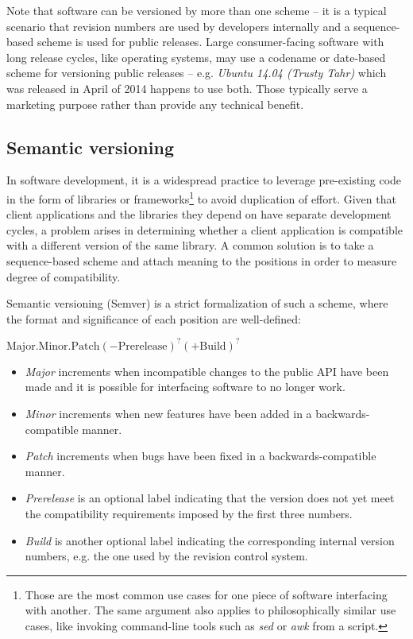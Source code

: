 \documentclass{l4proj}
\begin{document}
Note that software can be versioned by more than one scheme -- it is a
typical scenario that revision numbers are used by developers
internally and a sequence-based scheme is used for public releases.
Large consumer-facing software with long release cycles, like
operating systems, may use a codename or date-based scheme for
versioning public releases -- e.g. \textit{Ubuntu 14.04 (Trusty Tahr)}
which was released in April of 2014 happens to use both. Those
typically serve a marketing purpose rather than provide any technical
benefit.

\subsection{Semantic versioning}

In software development, it is a widespread practice to leverage
pre-existing code in the form of libraries or
frameworks\footnote{Those are the most common use cases for one piece
of software interfacing with another. The same argument also applies
to philosophically similar use cases, like invoking command-line tools
such as \textit{sed} or \textit{awk} from a script.} to avoid
duplication of effort. Given that client applications and the
libraries they depend on have separate development cycles, a problem
arises in determining whether a client application is compatible with
a different version of the same library. A common solution is to take
a sequence-based scheme and attach meaning to the positions in order
to measure degree of compatibility.

Semantic versioning\cite{SemanticVersioning} (Semver) is a strict
formalization of such a scheme, where the format and significance of
each position are well-defined:

\begin{center}
$\mathrm{Major.Minor.Patch}(-\mathrm{Prerelease})^?(+\mathrm{Build})^?$
\end{center}

\begin{itemize}
\item \textit{Major} increments when incompatible changes to the
public API have been made and it is possible for interfacing software
to no longer work.
\item \textit{Minor} increments when new features have been added in a
backwards-compatible manner.
\item \textit{Patch} increments when bugs have been fixed in a
backwards-compatible manner.
\item \textit{Prerelease} is an optional label indicating that the
version does not yet meet the compatibility requirements imposed by
the first three numbers.
\item \textit{Build} is another optional label indicating the
corresponding internal version numbers, e.g. the one used by the
revision control system.
\end{itemize}
\end{document}

